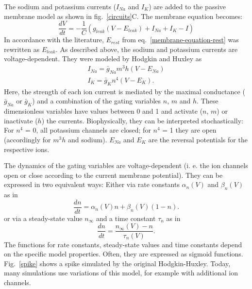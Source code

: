 \documentclass[12pt,a4paper,]{report}
\begin{document}
The sodium and potassium currents ($I_{Na}$ and $I_K$) are added to the
passive membrane model as shown in fig.~\ref{circuits}C. The membrane
equation becomes:
%
\begin{equation}
\label{membrane-equation-hh}
\frac{dV}{dt} = - \frac{1}{C} (g_{leak} (V - E_{leak}) + I_{Na} + I_K - I)
\end{equation}
%
 In accordance with the literature, $E_{rest}$ from
eq.~\ref{membrane-equation-rest} was rewritten as $E_{leak}$. As
described above, the sodium and potassium currents are
voltage-dependent. They were modeled by Hodgkin and Huxley as
%
\begin{equation}
\label{currents-hh}
\begin{split}
I_{Na} = \bar{g}_{Na} m^3 h (V - E_{Na}) \\
I_{K} = \bar{g}_K n^4 (V - E_K).
\end{split}
\end{equation}
%
 Here, the strength of each ion current is mediated by the maximal
conductance ($\bar{g}_{Na}$ or $\bar{g}_K$) and a combination of the
gating variables $n$, $m$ and $h$. These dimensionless variables have
values between 0 and 1 and activate ($n$, $m$) or inactivate ($h$) the
currents. Biophysically, they can be interpreted stochastically: For
$n^4$ = 0, all potassium channels are closed; for $n^4$ = 1 they are
open (accordingly for $m^3 h$ and sodium). $E_{Na}$ and $E_K$ are the
reversal potentials for the respective ions.

The dynamics of the gating variables are voltage-dependent (i. e. the
ion channels open or close according to the current membrane potential).
They can be expressed in two equivalent ways: Either via rate constants
$\alpha_n (V)$ and $\beta_n (V)$ as in
%
\begin{equation}
\label{rates-hh}
\frac{dn}{dt} = \alpha_n (V) n + \beta_n (V) (1 - n).
\end{equation}
%
 or via a steady-state value $n_{\infty}$ and a time constant $\tau_n$
as in
%
\begin{equation}
\label{steady-tau-hh}
\frac{dn}{dt} = \frac{n_{\infty}(V) - n}{\tau_n(V)}.
\end{equation}
%
 The functions for rate constants, steady-state values and time
constants depend on the specific model properties. Often, they are
expressed as sigmoid functions. Fig.~\ref{spike} shows a spike simulated
by the original Hodgkin-Huxley. Today, many simulations use variations
of this model, for example with additional ion channels.
\end{document}
